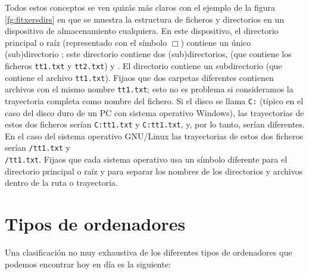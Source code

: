 Todos estos conceptos se ven quizás más claros con el ejemplo de la
figura \ref{fg:fitxersdirs} en que se muestra la estructura de
ficheros y directorios en un dispositivo de almacenamiento
cualquiera. En este dispositivo, el directorio principal o raíz
(representado con el símbolo $\Box$) contiene un único (sub)directorio
; este directorio contiene dos (sub)directorios, 
(que contiene los ficheros \texttt{tt1.txt} y \texttt{tt2.txt}) y
. El directorio  contiene un subdirectorio
 (que contiene el archivo \texttt{tt1.txt}). Fijaos que dos
carpetas diferentes contienen archivos con el mismo nombre
\texttt{tt1.txt}; esto no es problema si consideramos la trayectoria
completa como nombre del fichero. Si el disco se llama \texttt{C:}
(típico en el caso del disco duro de un PC con sistema operativo
Windows), las trayectorias de estos dos ficheros serían
\texttt{C:}\barra{}\barra{}\barra\texttt{tt1.txt} y
\texttt{C:}\barra{}\barra{}\barra{}\barra\texttt{tt1.txt},
y, por lo tanto, serían diferentes. En el caso del sistema operativo
GNU/Linux las trayectorias de estos dos ficheros serían
\texttt{/}\texttt{tt1.txt} y \\
\texttt{/}\texttt{tt1.txt}. Fijaos
que cada sistema operativo usa un símbolo diferente para el directorio
principal o raíz y para separar los nombres de los directorios y
archivos dentro de la ruta o trayectoria.

\section{Tipos de ordenadores} Una clasificación no muy exhaustiva de los diferentes tipos de ordenadores que podemos encontrar hoy en día es la siguiente: 

